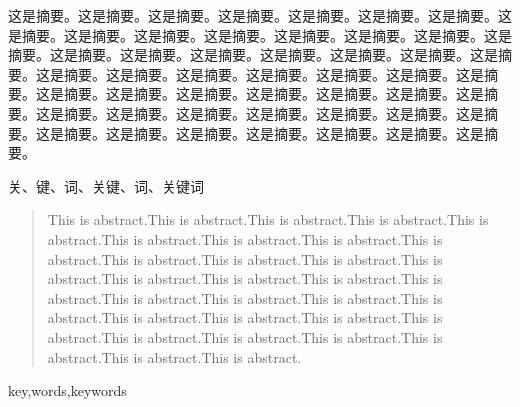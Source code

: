 
\begin{abstractcn}
这是摘要。这是摘要。这是摘要。这是摘要。这是摘要。这是摘要。这是摘要。这是摘要。这是摘要。这是摘要。这是摘要。这是摘要。这是摘要。这是摘要。这是摘要。这是摘要。这是摘要。这是摘要。这是摘要。这是摘要。这是摘要。这是摘要。这是摘要。这是摘要。这是摘要。这是摘要。这是摘要。这是摘要。这是摘要。这是摘要。这是摘要。这是摘要。这是摘要。这是摘要。这是摘要。这是摘要。这是摘要。这是摘要。这是摘要。这是摘要。这是摘要。这是摘要。这是摘要。这是摘要。这是摘要。这是摘要。这是摘要。这是摘要。这是摘要。这是摘要。
\end{abstractcn}

\begin{keywordscn}
关、键、词、关键、词、关键词
\end{keywordscn}

\begin{abstract}
This is abstract.This is abstract.This is abstract.This is abstract.This is abstract.This is abstract.This is abstract.This is abstract.This is abstract.This is abstract.This is abstract.This is abstract.This is abstract.This is abstract.This is abstract.This is abstract.This is abstract.This is abstract.This is abstract.This is abstract.This is abstract.This is abstract.This is abstract.This is abstract.This is abstract.This is abstract.This is abstract.This is abstract.This is abstract.This is abstract.This is abstract.
\end{abstract}

\begin{keywords}
key,words,keywords
\end{keywords} 
